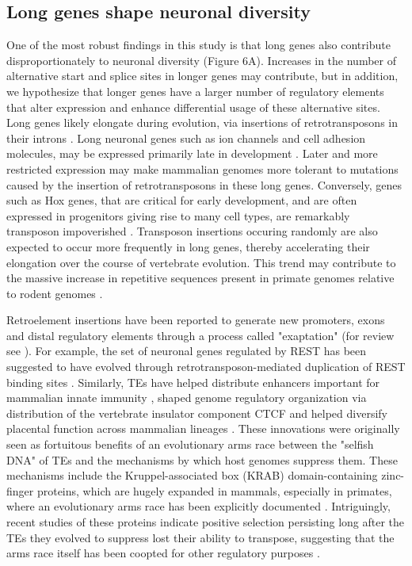 \subsection{Long genes shape neuronal diversity}
One of the most robust findings in this study is that long genes also contribute disproportionately to neuronal diversity (Figure 6A). Increases in the number of alternative start and splice sites in longer genes may contribute, but in addition, we hypothesize that longer genes have a larger number of regulatory elements that alter expression and enhance differential usage of these alternative sites. Long genes likely elongate during evolution, via insertions of retrotransposons in their introns \cite{Sela_2007,Grishkevich_2014}. Long neuronal genes such as ion channels and cell adhesion molecules, may be expressed primarily late in development \cite{Okaty_2009}. Later and more restricted expression may make mammalian genomes more tolerant to mutations caused by the insertion of retrotransposons in these long genes. Conversely, genes such as Hox genes, that are critical for early development, and are often expressed in progenitors giving rise to many cell types, are remarkably transposon impoverished \cite{Chinwalla_2002,Simons_2005}. Transposon insertions occuring randomly are also expected to occur more frequently in long genes, thereby accelerating their elongation over the course of vertebrate evolution. This trend may contribute to the massive increase in repetitive sequences present in primate genomes relative to rodent genomes \cite{Chuong_2016}. 

Retroelement insertions have been reported to generate new promoters, exons and distal regulatory elements through a process called "exaptation" (for review see \cite{Chuong_2016}). For example, the set of neuronal genes regulated by REST has been suggested to have evolved through retrotransposon-mediated duplication of REST binding sites \cite{Johnson_2006}. Similarly, TEs have helped distribute enhancers important for mammalian innate immunity \cite{Chuong_2016a}, shaped genome regulatory organization via distribution of the vertebrate insulator component CTCF\cite{Schmidt_2012} and helped diversify placental function across mammalian lineages \cite{Chuong_2013}. These innovations were originally seen as fortuitous benefits of an evolutionary arms race between the "selfish DNA" of TEs and the mechanisms by which host genomes suppress them. These mechanisms include the Kruppel-associated box (KRAB) domain-containing zinc-finger proteins, which are hugely expanded in mammals, especially in primates, where an evolutionary arms race has been explicitly documented \cite{Jacobs_2014}. Intriguingly, recent studies of these proteins indicate positive selection persisting long after the TEs they evolved to suppress lost their ability to transpose, suggesting that the arms race itself has been coopted for other regulatory purposes \cite{Imbeault_2017}. 

